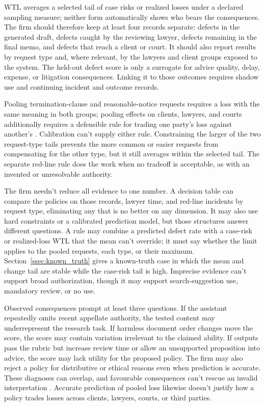 \documentclass[12pt]{article}
\begin{document}
WTL averages a selected tail of case risks or realized losses under a declared sampling measure; neither form automatically shows who bears the consequences. The firm should therefore keep at least four records separate: defects in the generated draft, defects caught by the reviewing lawyer, defects remaining in the final memo, and defects that reach a client or court. It should also report results by request type and, where relevant, by the lawyers and client groups exposed to the system. The held-out defect score is only a surrogate for advice quality, delay, expense, or litigation consequences. Linking it to those outcomes requires shadow use and continuing incident and outcome records.

Pooling termination-clause and reasonable-notice requests requires a loss with the same meaning in both groups; pooling effects on clients, lawyers, and courts additionally requires a defensible rule for trading one party's loss against another's \citep{KeeneyRaiffa1993}. Calibration can't supply either rule. Constraining the larger of the two request-type tails prevents the more common or easier requests from compensating for the other type, but it still averages within the selected tail. The separate red-line rule does the work when no tradeoff is acceptable, as with an invented or unresolvable authority.

The firm needn't reduce all evidence to one number. A decision table can compare the policies on those records, lawyer time, and red-line incidents by request type, eliminating any that is no better on any dimension. It may also use hard constraints or a calibrated prediction model, but those structures answer different questions. A rule may combine a predicted defect rate with a case-risk or realized-loss WTL that the mean can't override; it must say whether the limit applies to the pooled requests, each type, or their maximum. Section~\ref{ssec:known_truth} gives a known-truth case in which the mean and change tail are stable while the case-risk tail is high. Imprecise evidence can't support broad authorization, though it may support search-suggestion use, mandatory review, or no use.

Observed consequences prompt at least three questions. If the assistant repeatedly omits recent appellate authority, the tested content may underrepresent the research task. If harmless document order changes move the score, the score may contain variation irrelevant to the claimed ability. If outputs pass the rubric but increase review time or allow an unsupported proposition into advice, the score may lack utility for the proposed policy. The firm may also reject a policy for distributive or ethical reasons even when prediction is accurate. These diagnoses can overlap, and favourable consequences can't rescue an invalid interpretation \citep[746--749]{messick1995Validity}. Accurate prediction of pooled loss likewise doesn't justify how a policy trades losses across clients, lawyers, courts, or third parties.
\end{document}
